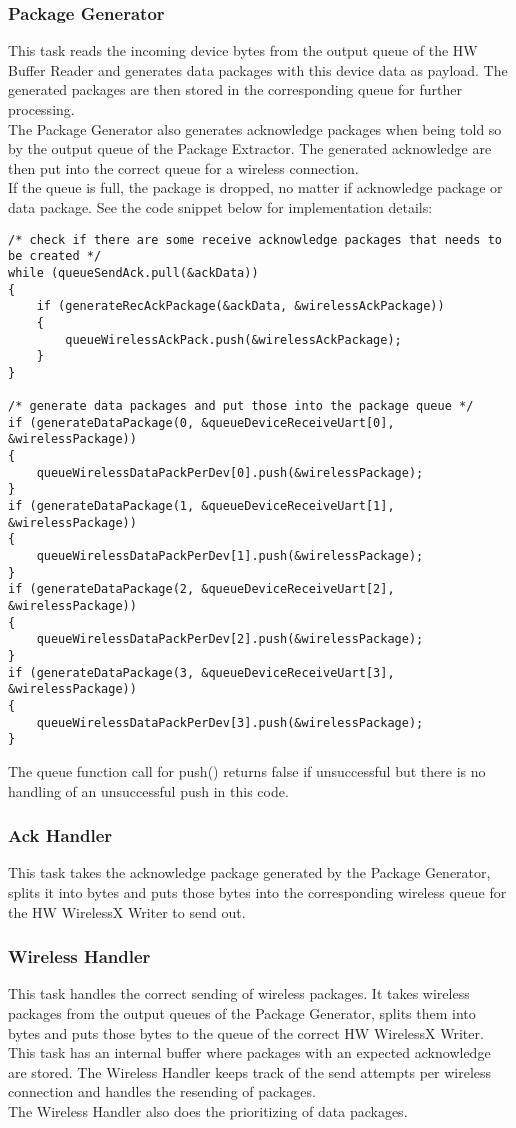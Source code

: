 \subsubsection{Package Generator}
This task reads the incoming device bytes from the output queue of the HW Buffer Reader and generates data packages with this device data as payload. The generated packages are then stored in the corresponding queue for further processing.\\
The Package Generator also generates acknowledge packages when being told so by the output queue of the Package Extractor. The generated acknowledge are then put into the correct queue for a wireless connection.\\
If the queue is full, the package is dropped, no matter if acknowledge package or data package. See the code snippet below for implementation details:\\
%
\begin{lstlisting}
/* check if there are some receive acknowledge packages that needs to be created */
while (queueSendAck.pull(&ackData))
{
    if (generateRecAckPackage(&ackData, &wirelessAckPackage))
    {
        queueWirelessAckPack.push(&wirelessAckPackage);
    }
}

/* generate data packages and put those into the package queue */
if (generateDataPackage(0, &queueDeviceReceiveUart[0], &wirelessPackage))
{
    queueWirelessDataPackPerDev[0].push(&wirelessPackage);
}
if (generateDataPackage(1, &queueDeviceReceiveUart[1], &wirelessPackage))
{
    queueWirelessDataPackPerDev[1].push(&wirelessPackage);
}
if (generateDataPackage(2, &queueDeviceReceiveUart[2], &wirelessPackage))
{
    queueWirelessDataPackPerDev[2].push(&wirelessPackage);
}
if (generateDataPackage(3, &queueDeviceReceiveUart[3], &wirelessPackage))
{
    queueWirelessDataPackPerDev[3].push(&wirelessPackage);
}
\end{lstlisting}
%
The queue function call for push() returns false if unsuccessful but there is no handling of an unsuccessful push in this code.
%
\subsubsection{Ack Handler}
This task takes the acknowledge package generated by the Package Generator, splits it into bytes and puts those bytes into the corresponding wireless queue for the HW WirelessX Writer to send out.
\subsubsection{Wireless Handler}
This task handles the correct sending of wireless packages. It takes wireless packages from the output queues of the Package Generator, splits them into bytes and puts those bytes to the queue of the correct HW WirelessX Writer.\\
This task has an internal buffer where packages with an expected acknowledge are stored. The Wireless Handler keeps track of the send attempts per wireless connection and handles the resending of packages.\\
The Wireless Handler also does the prioritizing of data packages.
%
%
